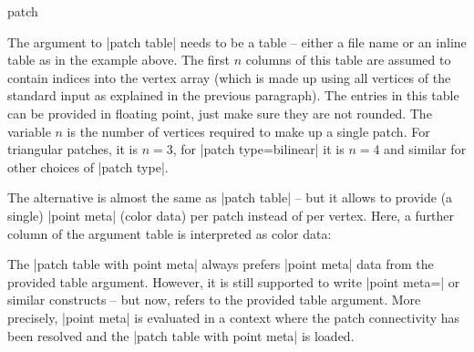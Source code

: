 {\begin{plottype}[/pgfplots]{patch}
\begin{pgfplotskeylist}
        The argument to |patch table| needs to be a table -- either a file name
        or an inline table as in the example above. The first $n$ columns of
        this table are assumed to contain indices into the vertex array (which
        is made up using all vertices of the standard input as explained in the
        previous paragraph). The entries in this table can be provided in
        floating point, just make sure they are not rounded. The variable $n$
        is the number of vertices required to make up a single patch. For
        triangular patches, it is $n=3$, for |patch type=bilinear| it is $n=4$
        and similar for other choices of |patch type|.

        The alternative  is almost the
        same as |patch table| -- but it allows to provide (a single)
        |point meta| (color data) per patch instead of per vertex. Here, a
        further column of the argument table is interpreted as color data:
\begin{codeexample}[]
\end{codeexample}
        \noindent The |patch table with point meta| always prefers |point meta|
        data from the provided table argument. However, it is still supported
        to write |point meta=\thisrow| or similar constructs --
        but now,  refers to the provided table argument. More
        precisely, |point meta| is evaluated in a context where the patch
        connectivity has been resolved and the |patch table with point meta| is
        loaded.


\end{pgfplotskeylist}
\end{plottype}}
